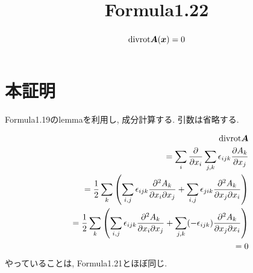 \documentclass{jsarticle}
\title{Formula1.22}
\newcommand*{\mbold}[1]{\mbox{\boldmath $#1$}}
\newcommand*{\divg}{{\rm div}}
\newcommand*{\rot}{{\rm rot}}
\begin{document}
\maketitle

\begin{abstract}
  \begin{equation}
    \divg\rot \mbold{A}(\mbold{x}) = 0
  \end{equation}
\end{abstract}

\section*{本証明}
Formula1.19のlemmaを利用し, 成分計算する. 引数は省略する. 

\begin{eqnarray}
  && \divg \rot \mbold{A} \nonumber \\
  && = \sum_i \frac{\partial}{\partial x_i} \sum_{j, k}\epsilon_{ijk}\frac{\partial A_k}{\partial x_j} \nonumber \\
  && = \frac{1}{2} \sum_k \left( \sum_{i, j} \epsilon_{ijk}\frac{\partial^2 A_k}{\partial x_i \partial x_j} + \sum_{i, j} \epsilon_{jik}\frac{\partial^2 A_k}{\partial x_j \partial x_i}\right)\nonumber \\
  && = \frac{1}{2} \sum_k \left( \sum_{i, j} \epsilon_{ijk}\frac{\partial^2 A_k}{\partial x_i \partial x_j} + \sum_{j, k} (-\epsilon_{ijk})\frac{\partial^2 A_k}{\partial x_j \partial x_i}\right) \nonumber \\
  && = 0
\end{eqnarray}
やっていることは, Formula1.21とほぼ同じ. 
\end{document}
